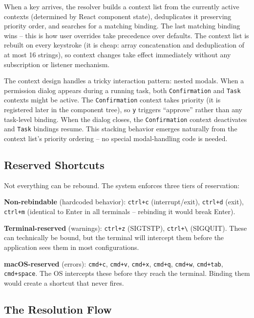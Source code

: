 \documentclass[
  english,
  11pt,
  letterpaper,
]{book}
\begin{document}
When a key arrives, the resolver builds a context list from the
currently active contexts (determined by React component state),
deduplicates it preserving priority order, and searches for a matching
binding. The last matching binding wins -- this is how user overrides
take precedence over defaults. The context list is rebuilt on every
keystroke (it is cheap: array concatenation and deduplication of at most
16 strings), so context changes take effect immediately without any
subscription or listener mechanism.

The context design handles a tricky interaction pattern: nested modals.
When a permission dialog appears during a running task, both
\texttt{Confirmation} and \texttt{Task} contexts might be active. The
\texttt{Confirmation} context takes priority (it is registered later in
the component tree), so \texttt{y} triggers ``approve'' rather than any
task-level binding. When the dialog closes, the \texttt{Confirmation}
context deactivates and \texttt{Task} bindings resume. This stacking
behavior emerges naturally from the context list's priority ordering --
no special modal-handling code is needed.

\subsection{Reserved Shortcuts}\label{reserved-shortcuts}

Not everything can be rebound. The system enforces three tiers of
reservation:

\textbf{Non-rebindable} (hardcoded behavior): \texttt{ctrl+c}
(interrupt/exit), \texttt{ctrl+d} (exit), \texttt{ctrl+m} (identical to
Enter in all terminals -- rebinding it would break Enter).

\textbf{Terminal-reserved} (warnings): \texttt{ctrl+z} (SIGTSTP),
\texttt{ctrl+\textbackslash{}} (SIGQUIT). These can technically be
bound, but the terminal will intercept them before the application sees
them in most configurations.

\textbf{macOS-reserved} (errors): \texttt{cmd+c}, \texttt{cmd+v},
\texttt{cmd+x}, \texttt{cmd+q}, \texttt{cmd+w}, \texttt{cmd+tab},
\texttt{cmd+space}. The OS intercepts these before they reach the
terminal. Binding them would create a shortcut that never fires.

\subsection{The Resolution Flow}\label{the-resolution-flow}
\end{document}

